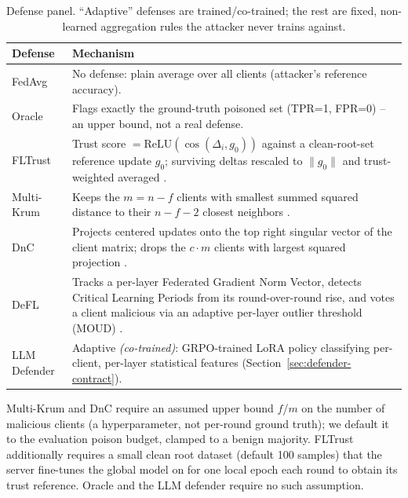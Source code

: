 \documentclass[conference]{IEEEtran}
\begin{document}
\begin{table}[t]
\caption{Defense panel. ``Adaptive'' defenses are trained/co-trained; the rest are fixed, non-learned aggregation rules the attacker never trains against.}
\label{tab:defenses}
\centering
\small
\begin{tabular}{@{}p{1.5cm}p{6cm}@{}}
\toprule
\textbf{Defense} & \textbf{Mechanism} \\
\midrule
FedAvg & No defense: plain average over all clients (attacker's reference accuracy). \\
Oracle & Flags exactly the ground-truth poisoned set (TPR=1, FPR=0) -- an upper bound, not a real defense. \\
FLTrust & Trust score $= \mathrm{ReLU}(\cos(\Delta_i, g_0))$ against a clean-root-set reference update $g_0$; surviving deltas rescaled to $\|g_0\|$ and trust-weighted averaged \cite{fltrust}. \\
Multi-Krum & Keeps the $m{=}n{-}f$ clients with smallest summed squared distance to their $n{-}f{-}2$ closest neighbors \cite{krum}. \\
DnC & Projects centered updates onto the top right singular vector of the client matrix; drops the $c \cdot m$ clients with largest squared projection \cite{dnc}. \\
DeFL & Tracks a per-layer Federated Gradient Norm Vector, detects Critical Learning Periods from its round-over-round rise, and votes a client malicious via an adaptive per-layer outlier threshold (MOUD) \cite{defl}. \\
LLM Defender & Adaptive \emph{(co-trained)}: GRPO-trained LoRA policy classifying per-client, per-layer statistical features (Section~\ref{sec:defender-contract}). \\
\bottomrule
\end{tabular}
\end{table}

Multi-Krum and DnC require an assumed upper bound $f$/$m$ on the number of malicious clients (a hyperparameter, not per-round ground truth); we default it to the evaluation poison budget, clamped to a benign majority. FLTrust additionally requires a small clean root dataset (default 100 samples) that the server fine-tunes the global model on for one local epoch each round to obtain its trust reference. Oracle and the LLM defender require no such assumption.
\end{document}
